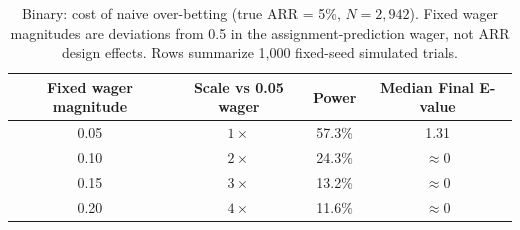 \begin{table}[htbp]
\centering
\caption{Binary: cost of naive over-betting (true ARR = 5\%, $N = 2{,}942$). Fixed wager magnitudes are deviations from 0.5 in the assignment-prediction wager, not ARR design effects. Rows summarize 1{,}000 fixed-seed simulated trials.}
\begin{tabular}{@{}cccc@{}}
\toprule
Fixed wager magnitude & Scale vs 0.05 wager & Power & Median Final E-value \\
\midrule
0.05 & $1\times$ & 57.3\% & 1.31 \\
0.10 & $2\times$ & 24.3\% & $\approx 0$ \\
0.15 & $3\times$ & 13.2\% & $\approx 0$ \\
0.20 & $4\times$ & 11.6\% & $\approx 0$ \\
\bottomrule
\end{tabular}
\label{tab:wage_binary}
\end{table}
